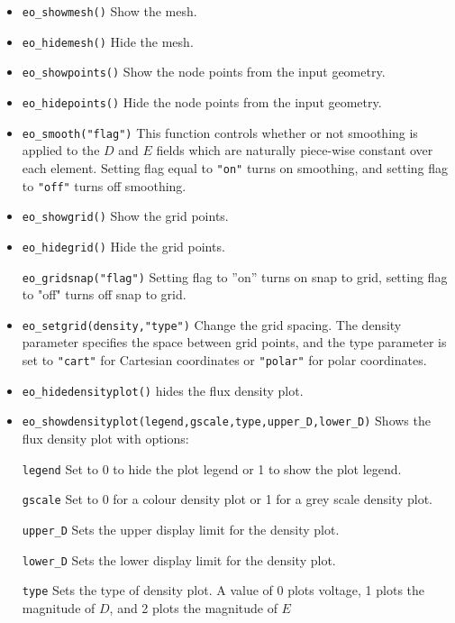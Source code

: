 \begin{itemize}
\item \texttt{eo\_showmesh()} Show the mesh.

\item \texttt{eo\_hidemesh()} Hide the mesh.

\item \texttt{eo\_showpoints()} Show the node points from the input geometry.

\item \texttt{eo\_hidepoints()} Hide the node points from the input geometry.

\item \texttt{eo\_smooth("flag")} This function controls whether or not smoothing is
applied to the $D$ and $E$ fields which are naturally piece-wise
constant over each element. Setting flag equal to \texttt{"on"}
turns on smoothing, and setting flag to \texttt{"off"} turns off
smoothing.

\item \texttt{eo\_showgrid()} Show the grid points.

\item \texttt{eo\_hidegrid()} Hide the grid points.

\texttt{eo\_gridsnap("flag")} Setting flag to ''on'' turns on snap to grid,
setting flag to "off" turns off snap to grid.

\item \texttt{eo\_setgrid(density,"type")} Change the grid spacing. The density
parameter specifies the space between grid points, and the type
parameter is set to \texttt{"cart"} for Cartesian coordinates or
\texttt{"polar"} for polar coordinates.

\item \texttt{eo\_hidedensityplot()} hides the flux density plot.

\item \texttt{eo\_showdensityplot(legend,gscale,type,upper{\_}D,lower{\_}D)} Shows the
flux density plot with options:

\texttt{legend} Set to 0 to hide the plot legend or 1 to show the plot
legend.

\texttt{gscale} Set to 0 for a colour density plot or 1 for a grey scale
density plot.

\texttt{upper{\_}D} Sets the upper display limit for the density plot.

\texttt{lower{\_}D} Sets the lower display limit for the density plot.

\texttt{type} Sets the type of density plot. A value of 0 plots voltage, 1
plots the magnitude of $D$, and 2 plots the magnitude of $E$


\end{itemize}
